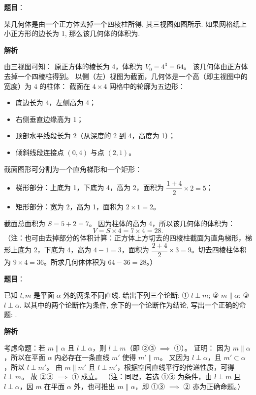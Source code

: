 \begin{answer}

\textbf{题目}：

某几何体是由一个正方体去掉一个四棱柱所得, 其三视图如图所示. 如果网格纸上小正方形的边长为 1, 那么该几何体的体积为\gkblank{}.
\nopagebreak[4]
\begin{center}\end{center}
\nopagebreak[4]
\textbf{解析}

由三视图可知：
原正方体的棱长为 4，体积为 $V_0 = 4^3 = 64$。
该几何体由正方体去掉一个四棱柱得到。
以侧（左）视图为截面，几何体是一个高（即主视图中的宽度）为 4 的柱体：
截面在 $4 \times 4$ 网格中的轮廓为五边形：
\begin{itemize}
\item 底边长为 4，左侧高为 4；
\item 右侧垂直边缘高为 1；
\item 顶部水平线段长为 2（从深度的 2 到 4，高度为 1）；
\item 倾斜线段连接点 $(0, 4)$ 与点 $(2, 1)$。
\end{itemize}
截面图形可分割为一个直角梯形和一个矩形：
\begin{itemize}
\item 梯形部分：上底为 1，下底为 4，高为 2，面积为 $\dfrac{1 + 4}{2} \times 2 = 5$；
\item 矩形部分：宽为 2，高为 1，面积为 $2 \times 1 = 2$。
\end{itemize}
截面总面积为 $S = 5 + 2 = 7$。
因为柱体的高为 4，所以该几何体的体积为：
\nopagebreak[4]
\[V = S \times 4 = 7 \times 4 = 28.\]
（注：也可由去掉部分的体积计算：正方体上方切去的四棱柱截面为直角梯形，梯形上底为 2，下底为 4，高为 $4 - 1 = 3$，面积为 $\dfrac{2 + 4}{2} \times 3 = 9$。切去四棱柱体积为 $9 \times 4 = 36$。所求几何体体积为 $64 - 36 = 28$。）


\end{answer}
\begin{answer}

\textbf{题目}：

已知 $l, m$ 是平面 $\alpha$ 外的两条不同直线. 给出下列三个论断:  
① $l \perp m$;  
② $m \parallel \alpha$;  
③ $l \perp \alpha$.  
以其中的两个论断作为条件, 余下的一个论断作为结论, 写出一个正确的命题: \gkblank{}.

\textbf{解析}

考虑命题：若 $m \parallel \alpha$ 且 $l \perp \alpha$，则 $l \perp m$（即 ②③ $\implies$ ①）。
证明：
因为 $m \parallel \alpha$，所以在平面 $\alpha$ 内必存在一条直线 $m'$ 使得 $m' \parallel m$。
又因为 $l \perp \alpha$，且 $m' \subset \alpha$，所以 $l \perp m'$。
由 $m \parallel m'$ 且 $l \perp m'$，根据空间直线平行的传递性质，可得 $l \perp m$。
故 ②③ $\implies$ ① 成立。
（注：同理，若选 ①③ 为条件，由 $l \perp m$ 且 $l \perp \alpha$，因 $m$ 在平面 $\alpha$ 外，也可推出 $m \parallel \alpha$，即 ①③ $\implies$ ② 亦为正确命题。）


\end{answer}
